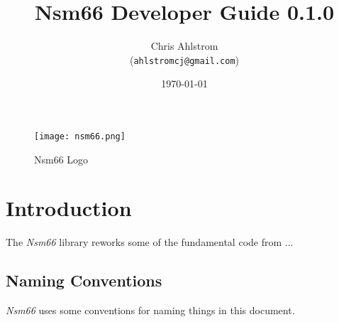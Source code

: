 \documentclass[
 11pt,
 twoside,
 a4paper,
 final                                 %
]{article}
\begin{document}
\title{Nsm66 Developer Guide 0.1.0}
\author{Chris Ahlstrom \\
   (\texttt{ahlstromcj@gmail.com})}
\date{\today}
\maketitle

\begin{figure}[H]
   \centering 
   \texttt{[image: nsm66.png]}
   \caption*{Nsm66 Logo}
\end{figure}

\clearpage                             %

\tableofcontents
\listoffigures                         %
\listoftables                          %


\setlength{\parindent}{2em}
\setlength{\parskip}{1ex plus 0.5ex minus 0.2ex}

\rhead{\rightmark}         %

\section{Introduction}
\label{sec:introduction}

   The \textsl{Nsm66} library reworks some of the fundamental code
   from ...

\subsection{Naming Conventions}
\label{subsec:introduction_conventions}

   \textsl{Nsm66} uses some conventions for naming things in this
   document.
\end{document}
